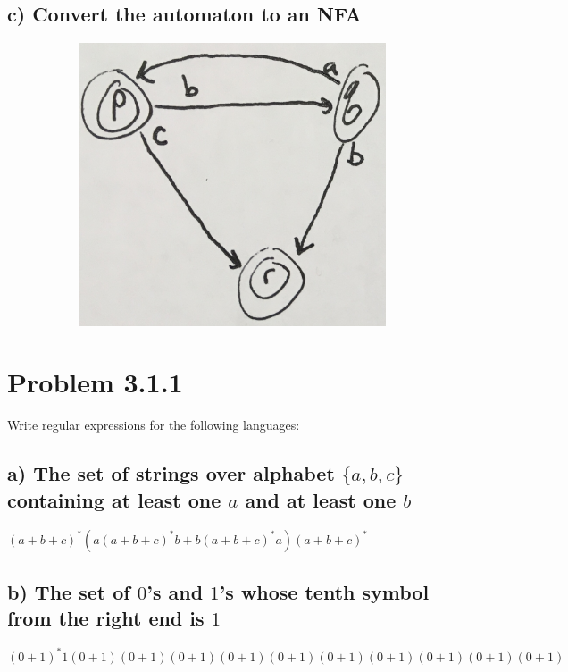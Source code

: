 \documentclass[20pt]{article} %
\begin{document}
\subsection{c) Convert the automaton to an NFA}
\begin{figure}[!htbp]
  	\centering
   	\begin{subfigure}[p]{0.4\linewidth}
    	\includegraphics[width=\linewidth]{./figures/h3-1.jpg}
   	\end{subfigure}
\end{figure} 

\newpage
\section{Problem 3.1.1}
Write regular expressions for the following languages:

\subsection{a) The set of strings over alphabet $\{a,b,c\}$ containing at least one $a$ and at least one $b$}
$(a+b+c)^{*}(a(a+b+c)^{*}b+b(a+b+c)^{*}a)(a+b+c)^{*}$

\subsection{b) The set of $0$'s and $1$'s whose tenth symbol from the right end is $1$}
$(0+1)^{*}1 (0+1)(0+1)(0+1)(0+1)(0+1)(0+1)(0+1)(0+1)(0+1)(0+1)$
\end{document}
